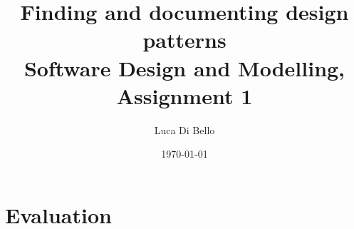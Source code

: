 \documentclass[a4paper, 11pt]{article}
\title{Finding and documenting design patterns \\[1ex] \large Software Design and Modelling, Assignment 1}
\author{Luca Di Bello}
\date{\today}
\begin{document}
\maketitle





\pagebreak

\section{Evaluation}

\printbibliography
\end{document}
